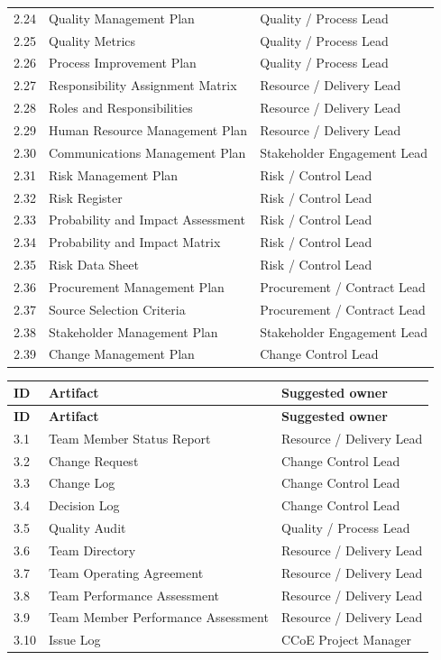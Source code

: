 \documentclass[10pt,letterpaper]{article}
\newcommand{\smallsection}[1]{\par\Needspace{3\baselineskip}\vspace{5pt}{\normalsize\sffamily\bfseries\color{blue}#1}\par}
\begin{document}
\begin{longtable}{@{}p{.65in}p{2.95in}p{2.35in}@{}}
2.24 & Quality Management Plan & Quality / Process Lead\\
2.25 & Quality Metrics & Quality / Process Lead\\
2.26 & Process Improvement Plan & Quality / Process Lead\\
2.27 & Responsibility Assignment Matrix & Resource / Delivery Lead\\
2.28 & Roles and Responsibilities & Resource / Delivery Lead\\
2.29 & Human Resource Management Plan & Resource / Delivery Lead\\
2.30 & Communications Management Plan & Stakeholder Engagement Lead\\
2.31 & Risk Management Plan & Risk / Control Lead\\
2.32 & Risk Register & Risk / Control Lead\\
2.33 & Probability and Impact Assessment & Risk / Control Lead\\
2.34 & Probability and Impact Matrix & Risk / Control Lead\\
2.35 & Risk Data Sheet & Risk / Control Lead\\
2.36 & Procurement Management Plan & Procurement / Contract Lead\\
2.37 & Source Selection Criteria & Procurement / Contract Lead\\
2.38 & Stakeholder Management Plan & Stakeholder Engagement Lead\\
2.39 & Change Management Plan & Change Control Lead\\
\bottomrule\end{longtable}\endgroup
\smallsection{3.0 Executing Process Group}
\begingroup\footnotesize\begin{longtable}{@{}p{.65in}p{2.95in}p{2.35in}@{}}\toprule\textbf{ID} & \textbf{Artifact} & \textbf{Suggested owner}\\\midrule\endfirsthead\toprule\textbf{ID} & \textbf{Artifact} & \textbf{Suggested owner}\\\midrule\endhead
3.1 & Team Member Status Report & Resource / Delivery Lead\\
3.2 & Change Request & Change Control Lead\\
3.3 & Change Log & Change Control Lead\\
3.4 & Decision Log & Change Control Lead\\
3.5 & Quality Audit & Quality / Process Lead\\
3.6 & Team Directory & Resource / Delivery Lead\\
3.7 & Team Operating Agreement & Resource / Delivery Lead\\
3.8 & Team Performance Assessment & Resource / Delivery Lead\\
3.9 & Team Member Performance Assessment & Resource / Delivery Lead\\
3.10 & Issue Log & CCoE Project Manager\\
\bottomrule\end{longtable}\endgroup
\end{document}
